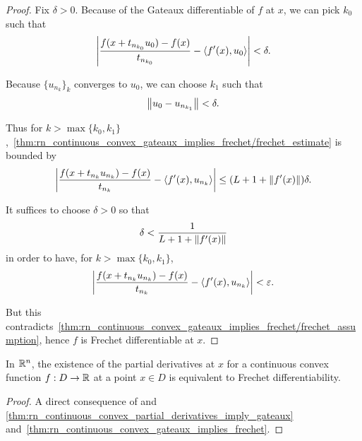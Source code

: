 \begin{proof}
  Fix $\delta > 0$. Because of the Gateaux differentiable of $f$ at $x$, we can pick $k_0$ such that
  \begin{align*}
    \left\vert \frac {f(x + t_{n_{k_0}} u_0) - f(x)} {t_{n_{k_0}}} - \left\langle f'(x), u_0 \right\rangle \right\vert < \delta.
  \end{align*}

  Because $\{ u_{n_k} \}_k$ converges to $u_0$, we can choose $k_1$ such that
  \begin{align*}
    \left\Vert u_0 - u_{n_{k_1}} \right\Vert < \delta.
  \end{align*}

  Thus for $k > \max \{ k_0, k_1 \}$,~\cref{thm:rn_continuous_convex_gateaux_implies_frechet/frechet_estimate} is bounded by
  \begin{align*}
    \left\vert \frac {f(x + t_{n_k} u_{n_k}) - f(x)} {t_{n_k}} - \left\langle f'(x), u_{n_k} \right\rangle \right\vert
    \leq
    (L + 1 + \left\Vert f'(x) \right\Vert) \delta.
  \end{align*}

  It suffices to choose $\delta > 0$ so that
  \begin{align*}
    \delta < \frac 1 {L + 1 + \left\Vert f'(x) \right\Vert}
  \end{align*}
  in order to have, for $k > \max \{ k_0, k_1 \}$,
  \begin{align*}
    \left\vert \frac {f(x + t_{n_k} u_{n_k}) - f(x)} {t_{n_k}} - \left\langle f'(x), u_{n_k} \right\rangle \right\vert < \varepsilon.
  \end{align*}

  But this contradicts~\cref{thm:rn_continuous_convex_gateaux_implies_frechet/frechet_assumption}, hence $f$ is Frechet differentiable at $x$.
\end{proof}

\begin{corollary}\label{thm:rn_continuous_convex_partial_derivatives_imply_frechet}
  In $\mathbb{R}^n$, the existence of the partial derivatives at $x$ for a continuous convex function $f: D \to \mathbb{R}$ at a point $x \in D$ is equivalent to Frechet differentiability.
\end{corollary}
\begin{proof}
  A direct consequence of and \cref{thm:rn_continuous_convex_partial_derivatives_imply_gateaux} and~\cref{thm:rn_continuous_convex_gateaux_implies_frechet}.
\end{proof}

